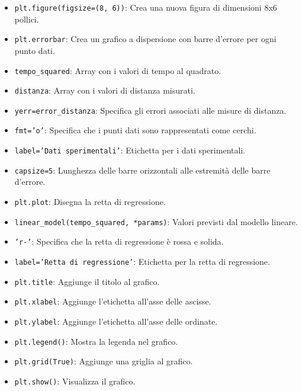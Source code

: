 \begin{itemize}
    \item \texttt{plt.figure(figsize=(8, 6))}: Crea una nuova figura di dimensioni 8x6 pollici.
    \item \texttt{plt.errorbar}: Crea un grafico a dispersione con barre d'errore per ogni punto dati.
    \item \texttt{tempo\_squared}: Array con i valori di tempo al quadrato.
    \item \texttt{distanza}: Array con i valori di distanza misurati.
    \item \texttt{yerr=error\_distanza}: Specifica gli errori associati alle misure di distanza.
    \item \texttt{fmt='o'}: Specifica che i punti dati sono rappresentati come cerchi.
    \item \texttt{label='Dati sperimentali'}: Etichetta per i dati sperimentali.
    \item \texttt{capsize=5}: Lunghezza delle barre orizzontali alle estremità delle barre d'errore.
    \item \texttt{plt.plot}: Disegna la retta di regressione.
    \item \texttt{linear\_model(tempo\_squared, *params)}: Valori previsti dal modello lineare.
    \item \texttt{'r-'}: Specifica che la retta di regressione è rossa e solida.
    \item \texttt{label='Retta di regressione'}: Etichetta per la retta di regressione.
    \item \texttt{plt.title}: Aggiunge il titolo al grafico.
    \item \texttt{plt.xlabel}: Aggiunge l'etichetta all'asse delle ascisse.
    \item \texttt{plt.ylabel}: Aggiunge l'etichetta all'asse delle ordinate.
    \item \texttt{plt.legend()}: Mostra la legenda nel grafico.
    \item \texttt{plt.grid(True)}: Aggiunge una griglia al grafico.
    \item \texttt{plt.show()}: Visualizza il grafico.
\end{itemize}



